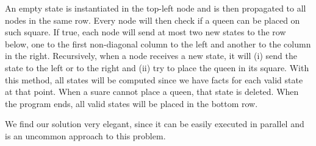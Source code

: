 An empty state is instantiated in the top-left node and is then propagated to all nodes in the same row.
Every node will then check if a queen can be placed on such square. If true, each node will send at most
two new states to the row below, one to the first non-diagonal column to the left and another to the column
in the right.
Recursively, when a node receives a new state, it will (i) send the state to the left
or to the right and (ii) try to place the queen in its square. With this method,
all states will be computed since we have facts for each valid state
at that point. When a suare cannot place a queen, that state is deleted.
When the program ends, all valid states will be placed in the bottom row.

We find our solution very elegant, since it can be easily executed in parallel and is an uncommon
approach to this problem.

